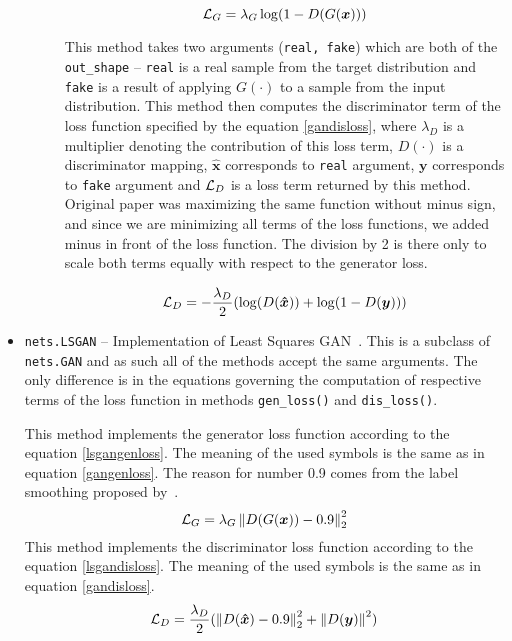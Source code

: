 \begin{itemize}
\begin{description}
\begin{equation}
\mathcal{L}_{G} = \lambda_G\log(1 - D(G(\bm{x})))
\label{origgangenloss}
\end{equation}

 This method takes two arguments (\texttt{real, fake}) which are both of the \texttt{out\_shape} -- \texttt{real} is a real sample from the target distribution and \texttt{fake} is a result of applying $G(\cdot)$ to a sample from the input distribution. This method then computes the discriminator term of the loss function specified by the equation \ref{gandisloss}, where $\lambda_D$ is a multiplier denoting the contribution of this loss term, $D(\cdot)$ is a discriminator mapping, $\bm{\hat{x}}$ corresponds to \texttt{real} argument, $\bm{y}$ corresponds to \texttt{fake} argument and $\mathcal{L}_D$ is a loss term returned by this method. Original paper was maximizing the same function without minus sign, and since we are minimizing all terms of the loss functions, we added minus in front of the loss function. The division by 2 is there only to scale both terms equally with respect to the generator loss.

\begin{equation}
\mathcal{L}_D = -\frac{\lambda_D}{2} (\log(D(\bm{\hat{x}})) + \log(1 - D(\bm{y})))
\label{gandisloss}
\end{equation}

\end{description}

\item \texttt{nets.LSGAN} -- Implementation of Least Squares GAN~\cite{lsgan}. This is a subclass of \texttt{nets.GAN} and as such all of the methods accept the same arguments. The only difference is in the equations governing the computation of respective terms of the loss function in methods \texttt{gen\_loss()} and \texttt{dis\_loss()}.
\begin{description}
 This method implements the generator loss function according to the equation \ref{lsgangenloss}. The meaning of the used symbols is the same as in equation \ref{gangenloss}. The reason for number 0.9 comes from the label smoothing proposed by~\cite{improvedgan,smooth}.
\begin{equation}
\mathcal{L}_G = \lambda_G \left\lVert D(G(\bm{x})) - 0.9\right\rVert_2^2
\label{lsgangenloss}
\end{equation}
 This  method implements the discriminator loss function according to the equation \ref{lsgandisloss}. The meaning of the used symbols is the same as in equation \ref{gandisloss}.
\begin{equation}
\mathcal{L}_D = \frac{\lambda_D}{2} (\left\lVert D(\bm{\hat{x}}) - 0.9\right\rVert_2^2 + \left\lVert D(\bm{y})\right\rVert^2)
\label{lsgandisloss}
\end{equation}


\end{description}
\end{itemize}
